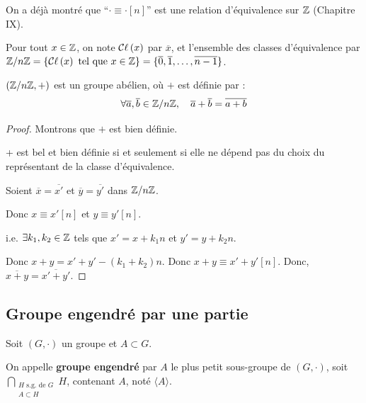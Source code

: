 \documentclass[12pt, a4paper]{report}
\begin{document}
\begin{remark}
    On a déjà montré que ``$\cdot \equiv \cdot [n]$'' est une relation d'équivalence sur $\mathbb{Z}$ (Chapitre IX).

    Pour tout $x \in \mathbb{Z}$, on note $\mathcal{C}\ell\left(x\right)$ par $\overline{x}$, et l'ensemble des classes d'équivalence par $\mathbb{Z}/n\mathbb{Z}=\{\mathcal{C}\ell\left(x\right)\text{ tel que } x\in\mathbb{Z}\}=\{\overline{0}, \overline{1}, \ldots, \overline{n-1}\}$.
\end{remark}

\begin{proposition}
    $(\mathbb{Z}/n\mathbb{Z},+)$ est un groupe abélien, où $+$ est définie par :
    $$\forall \overline{a}, \overline{b} \in \mathbb{Z}/n\mathbb{Z}, \quad \overline{a} + \overline{b} = \overline{a+b}$$
\end{proposition}

\begin{proof}
    Montrons que $+$ est bien définie.

    + est bel et bien définie si et seulement si elle ne dépend pas du choix du représentant de la classe d'équivalence.

    Soient $\overline{x} = \overline{x'}$ et $\overline{y} = \overline{y'}$ dans $\mathbb{Z}/n\mathbb{Z}$.

    Donc $x \equiv x' [n]$ et $y \equiv y' [n]$.

    i.e. $\exists k_1,k_2 \in \mathbb{Z}$ tels que $x' = x + k_1 n$ et $y' = y + k_2 n$.

    Donc $x+y = x' + y' - (k_1 + k_2) n$.
    Donc $x + y \equiv x' + y' [n]$.
    Donc, $\overline{x+y} = \overline{x' + y'}$.
\end{proof}

\subsection{Groupe engendré par une partie}

\begin{definition}
    Soit $(G,\cdot)$ un groupe et $A \subset G$.

    On appelle \textbf{groupe engendré} par $A$ le plus petit sous-groupe de $(G,\cdot)$, soit $\underset{\substack{H\text{ s.g. de }G \\ A \subset H}}{\bigcap} H$, contenant $A$, noté $\langle A \rangle$.
\end{definition}
\end{document}
